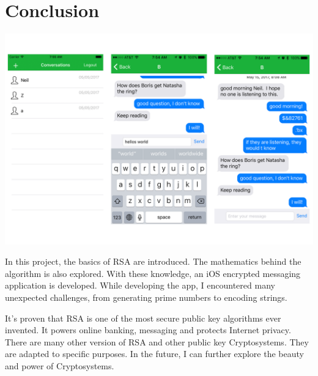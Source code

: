 \documentclass[]{article}
\begin{document}
\section{Conclusion}

\centerline{ \includegraphics[scale=0.15]{screen_shot}}

In this project, the basics of RSA are introduced. The mathematics behind the algorithm is also explored. With these knowledge, an iOS encrypted messaging application is developed. While developing the app, I encountered many unexpected challenges, from generating prime numbers to encoding strings. 

It's proven that RSA is one of the most secure public key algorithms ever invented. It powers online banking, messaging and protects Internet privacy. There are many other version of RSA and other public key Cryptosystems. They are adapted to specific purposes. In the future, I can further explore the beauty and power of Cryptosystems. 
\end{document}
